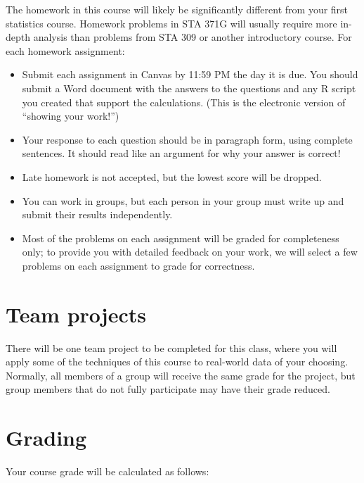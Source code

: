 \documentclass[12pt]{article}
\begin{document}
The homework in this course will likely be significantly different from your first statistics course.  Homework problems in STA 371G will usually require more in-depth analysis than problems from STA 309 or another introductory course.  For each homework assignment:

\begin{itemize}
\item Submit each assignment in Canvas by 11:59 PM the day it is due.  You should submit a Word document with the answers to the questions and any R script you created that support the calculations.  (This is the electronic version of ``showing your work!'')
\item Your response to each question should be in paragraph form, using complete sentences.  It should read like an argument for why your answer is correct!
\item Late homework is not accepted, but the lowest score will be dropped.  
\item You can work in groups, but each person in your group must write up and submit their results independently.
\item Most of the problems on each assignment will be graded for completeness only; to provide you with detailed feedback on your work, we will select a few problems on each assignment to grade for correctness.
\end{itemize}


\section*{Team projects}


There will be one team project to be completed for this class, where you will apply some of the techniques of this course to real-world data of your choosing.  Normally, all members of a group will receive the same grade for the project, but group members that do not fully participate may have their grade reduced.  


\section*{Grading}


Your course grade will be calculated as follows:
\end{document}
